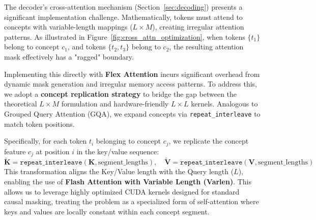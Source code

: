 The decoder's cross-attention mechanism (Section~\ref{sec:decoding}) presents a significant implementation challenge. Mathematically, tokens must attend to concepts with variable-length mappings ($L \times M$), creating irregular attention patterns. As illustrated in Figure~\ref{fig:cross_attn_optimization}, when tokens $\{t_1\}$ belong to concept $c_1$, and tokens $\{t_2, t_3\}$ belong to $c_2$, the resulting attention mask effectively has a "ragged" boundary.

Implementing this directly with \textbf{Flex Attention} incurs significant overhead from dynamic mask generation and irregular memory access patterns. To address this, we adopt a \textbf{concept replication strategy} to bridge the gap between the theoretical $L \times M$ formulation and hardware-friendly $L \times L$ kernels. Analogous to Grouped Query Attention (GQA), we expand concepts via \texttt{repeat\_interleave} to match token positions.

Specifically, for each token $t_i$ belonging to concept $c_j$, we replicate the concept feature $c_j$ at position $i$ in the key/value sequence:
\begin{equation}
\tilde{\mathbf{K}} = \texttt{repeat\_interleave}(\mathbf{K}, \text{segment\_lengths}), \quad \tilde{\mathbf{V}} = \texttt{repeat\_interleave}(\mathbf{V}, \text{segment\_lengths})
\end{equation}
This transformation aligns the Key/Value length with the Query length ($L$), enabling the use of \textbf{Flash Attention with Variable Length (Varlen)}. This allows us to leverage highly optimized CUDA kernels designed for standard causal masking, treating the problem as a specialized form of self-attention where keys and values are locally constant within each concept segment.

